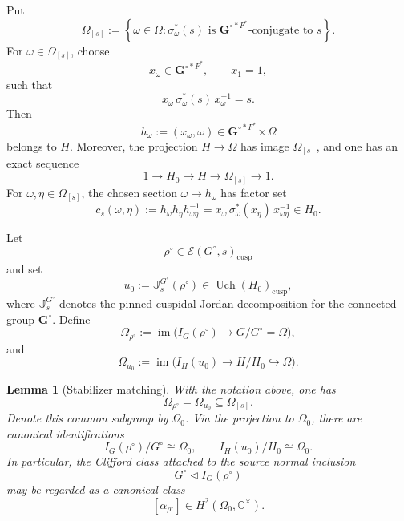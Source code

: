 \documentclass{amsart}
\theoremstyle{plain}
\numberwithin{equation}{section}
\newtheorem{lemma}[theorem]{Lemma}
\theoremstyle{definition}
\newcommand{\cE}{\mathcal{E}}
\newcommand{\Uch}{\operatorname{Uch}}
\newcommand{\J}{\mathbb{J}}
\newcommand{\cusp}{\operatorname{cusp}}
\newcommand{\bG}{\mathbf{G}}
\newcommand{\C}{\mathbb{C}}
\begin{document}
Put
\[
\Omega_{[s]}
:=
\left\{
\omega\in\Omega:
\sigma_\omega^*(s)
\text{ is } \bG^{\circ *F^*}\text{-conjugate to }s
\right\}.
\]
For \(\omega\in\Omega_{[s]}\), choose
\[
x_\omega\in \bG^{\circ *F^*},
\qquad x_1=1,
\]
such that
\begin{equation}\label{eq:xomega-conjugates-s}
x_\omega\,\sigma_\omega^*(s)\,x_\omega^{-1}=s.
\end{equation}
Then
\[
h_\omega:=(x_\omega,\omega)\in
\bG^{\circ *F^*}\rtimes\Omega
\]
belongs to \(H\).  Moreover, the projection \(H\to\Omega\) has image
\(\Omega_{[s]}\), and one has an exact sequence
\begin{equation}\label{eq:H-H0-Omega-class}
1\longrightarrow H_0
\longrightarrow H
\longrightarrow \Omega_{[s]}
\longrightarrow 1.
\end{equation}
For \(\omega,\eta\in\Omega_{[s]}\), the chosen section
\(\omega\mapsto h_\omega\) has factor set
\begin{equation}\label{eq:centralizer-factor-set}
c_s(\omega,\eta)
:=
h_\omega h_\eta h_{\omega\eta}^{-1}
=
x_\omega\,\sigma_\omega^*(x_\eta)\,x_{\omega\eta}^{-1}
\in H_0 .
\end{equation}

Let
\[
\rho^\circ\in \cE(G^\circ,s)_{\cusp}
\]
and set
\[
u_0:=\J_s^{G^\circ}(\rho^\circ)\in \Uch(H_0)_{\cusp},
\]
where \(\J_s^{G^\circ}\) denotes the pinned cuspidal Jordan decomposition for
the connected group \(\bG^\circ\).  Define
\[
\Omega_{\rho^\circ}
:=
\operatorname{im}\bigl(I_G(\rho^\circ)\to G/G^\circ=\Omega\bigr),
\]
and
\[
\Omega_{u_0}
:=
\operatorname{im}\bigl(I_H(u_0)\to H/H_0\hookrightarrow\Omega\bigr).
\]

\begin{lemma}[Stabilizer matching]
\label{lem:disc-stabilizer-match}
With the notation above, one has
\[
\Omega_{\rho^\circ}=\Omega_{u_0}\subseteq \Omega_{[s]}.
\]
Denote this common subgroup by \(\Omega_0\).  Via the projection to
\(\Omega_0\), there are canonical identifications
\[
I_G(\rho^\circ)/G^\circ\cong \Omega_0,
\qquad
I_H(u_0)/H_0\cong \Omega_0.
\]
In particular, the Clifford class attached to the source normal inclusion
\[
        G^\circ\lhd I_G(\rho^\circ)
\]
may be regarded as a canonical class
\[
        [\alpha_{\rho^\circ}]\in H^2(\Omega_0,\C^\times).
\]
\end{lemma}
\end{document}
